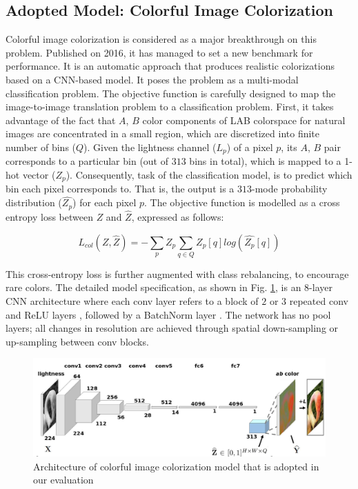 \documentclass{article} %
\begin{document}
\subsection{\textbf{Adopted Model: Colorful Image Colorization}}
Colorful image colorization \cite{zhang2016colorful} is considered as a major breakthrough on this problem. Published on 2016, it has managed to set a new benchmark for performance. It is an automatic approach that produces realistic colorizations based on a CNN-based model. 
It poses the problem as a multi-modal classification problem. The objective function is carefully designed to map the image-to-image translation problem to a classification problem. First, it takes advantage of the fact that $A$, $B$ color components of LAB colorspace for natural images are concentrated in a small region, which are discretized into finite number of bins ($Q$). 
Given the lightness channel ($L_p$) of a pixel $p$, its $A$, $B$ pair corresponds to a particular bin (out of $313$ bins in total), which is mapped to a 1-hot vector ($Z_p$). 
Consequently, task of the classification model, is to predict which bin each pixel corresponds to. That is, the output is a $313$-mode probability distribution ($ \hat{Z_p}$) for each pixel $p$. The objective function is modelled as a cross entropy loss between $Z$ and $\hat{Z}$, expressed as follows: 

\[ L_{col}(Z, \hat{Z}) = - \sum_p Z_p \sum_{q \in Q} Z_p[q] log(\hat{Z_p}[q])   \] 

This cross-entropy loss is further augmented with class rebalancing, to encourage rare colors. The detailed model specification, as shown in Fig. \ref{fig:col_main}, is an 8-layer CNN architecture where each conv layer refers to a block of $2$ or $3$ repeated
conv and ReLU layers \cite{nair2010rectified}, followed by a BatchNorm layer \cite{ioffe2015batch}. The network has no pool layers; 
all changes in resolution are achieved through spatial down-sampling or up-sampling between conv blocks.


\begin{figure}[h]
\centering
\includegraphics[width=0.8 \linewidth]{Figs/one.jpg} 
\caption{Architecture of colorful image colorization model \cite{zhang2016colorful} that is adopted in our evaluation}
\label{fig:col_main}
\end{figure}  
\end{document}
